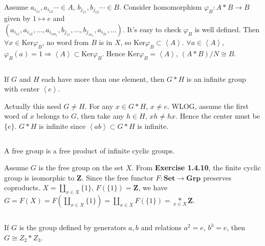 \begin{answer}
    Assume $a_{i_{11}},a_{i_{12}}\cdots\in A$, $b_{j_{11}},b_{j_{12}}\cdots\in B$. Consider homomorphism $\varphi_{B}:A*B\to B$ given by $1\mapsto e$ and \\$(a_{i_{11}}, a_{i_{12}},\dots,a_{i_{1m_{1}}},b_{j_{11}}, \dots, b_{j_{1n_{1}}},a_{i_{21}},\dots)$. It's easy to check $\varphi_{B}$ is well defined. Then $\forall x\in \mathrm{Ker}\varphi_{B}$, no word from $B$ is in $X$, so $\mathrm{Ker}\varphi_{B}\subset\left\langle A\right\rangle$. $\forall a\in\left\langle A\right\rangle$, $\varphi_{B}(a)=1\Rightarrow\left\langle A\right\rangle\subset \mathrm{Ker}\varphi_{B}$. Hence $\mathrm{Ker}\varphi_{B}=\left\langle A\right\rangle$, $(A*B) /N\cong B$.
\end{answer}

$$ $$

\begin{ex}
    If $G$ and $H$ each have more than one element, then $G*H$ is an infinite group with center $\left\langle e\right\rangle$.
\end{ex}

\begin{answer}
    Actually this need $G\neq H$. For any $x\in G*H$, $x\neq e$. WLOG, assume the first word of $x$ belongs to $G$, then take any $h\in H$, $xh\neq hx$. Hence the center must be $\{e\}$. $G*H$ is infinite since $\left\langle ab\right\rangle\subset G*H$ is infinite.
\end{answer}

$$ $$

\begin{ex}
    A free group is a free product of infinite cyclic groups.
\end{ex}

\begin{answer}
    Assume $G$ is the free group on the set $X$. From \textbf{Exercise 1.4.10}, the finite cyclic group is isomorphic to $\mathbf{Z}$. Since the free functor $F:\mathrm{\mathbf{Set}} \to \mathrm{\mathbf{Grp}}$ preserves coproducts. $X=\coprod\limits_{x\in X}\{1\}$, $F(\{1\})=\mathbf{Z}$, we have $G=F(X)=F(\coprod\limits_{x\in X}\{1\})=\coprod\limits_{x\in X}F(\{1\})=\mathop{*}\limits_{x\in X}\mathbf{Z}$.
\end{answer}

$$ $$

\begin{ex}
    If $G$ is the group defined by generators $a, b$ and relations $a^{2}=e$, $b^{3}=e$, then $G\cong Z_{2}*Z_{3}$.
\end{ex}

